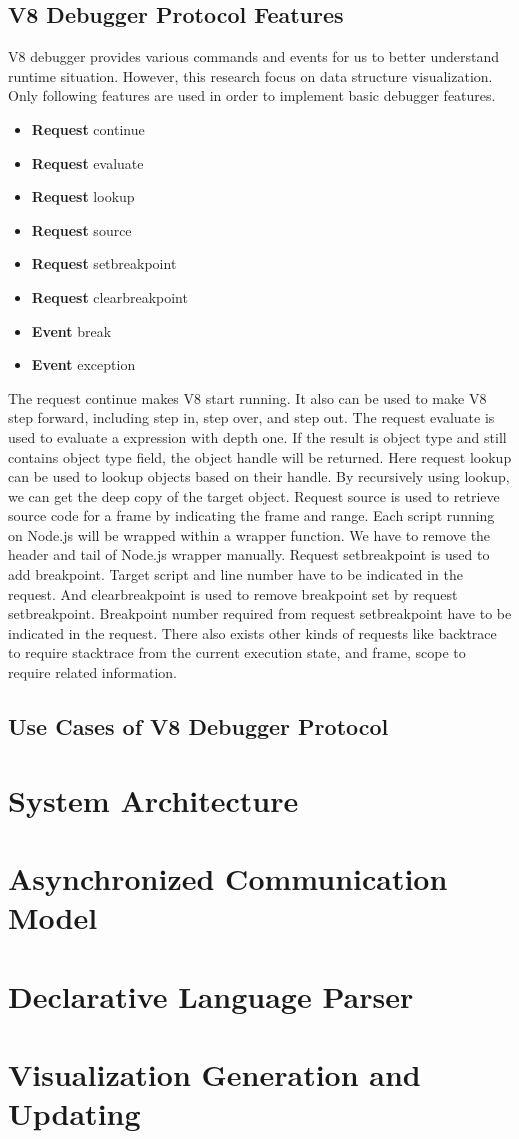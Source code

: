 \subsection {V8 Debugger Protocol Features}
V8 debugger provides various commands and events for us to better understand runtime situation. However, this research focus on data structure visualization. Only following features are used in order to implement basic debugger features.

\begin {itemize}
\item \textbf{Request} continue
\item \textbf{Request} evaluate
\item \textbf{Request} lookup
\item \textbf{Request} source
\item \textbf{Request} setbreakpoint
\item \textbf{Request} clearbreakpoint
\item \textbf{Event} break
\item \textbf{Event} exception
\end {itemize} 

The request continue makes V8 start running. It also can be used to make V8 step forward, including step in, step over, and step out. The request evaluate is used to evaluate a expression with depth one. If the result is object type and still contains object type field, the object handle will be returned. Here request lookup can be used to lookup objects based on their handle. By recursively using lookup, we can get the deep copy of the target object. Request source is used to retrieve source code for a frame by indicating the frame and range. Each script running on Node.js will be wrapped within a wrapper function. We have to remove the header and tail of Node.js wrapper manually. Request setbreakpoint is used to add breakpoint. Target script and line number have to be indicated in the request. And clearbreakpoint is used to remove breakpoint set by request setbreakpoint. Breakpoint number required from request setbreakpoint have to be indicated in the request. There also exists other kinds of requests like backtrace to require stacktrace from the current execution state, and frame, scope to require related information.

\subsection {Use Cases of V8 Debugger Protocol}

\section {System Architecture}

\section {Asynchronized Communication Model}

\section {Declarative Language Parser}

\section {Visualization Generation and Updating}
